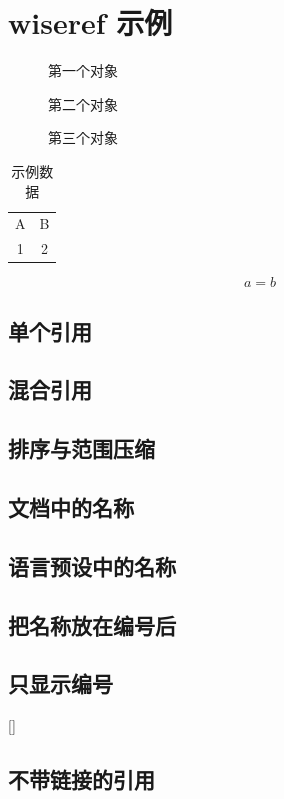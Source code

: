 \documentclass[fontset=fandol]{ctexart}
\newcommand\Result[2]{\par\noindent\hypertarget{example.#1}{}#2\par}
\begin{document}
\section*{wiseref 示例}
\begin{figure}[htbp]\centering{}\caption{第一个对象}\label{picture-a}\end{figure}
\begin{figure}[htbp]\centering{}\caption{第二个对象}\label{picture-b}\end{figure}
\begin{figure}[htbp]\centering{}\caption{第三个对象}\label{picture-c}\end{figure}
\begin{table}[htbp]\centering\caption{示例数据}\label{table-a}
  \begin{tabular}{cc}A&B\\1&2\end{tabular}
\end{table}
\begin{equation}a=b\label{equation}\end{equation}
\clearpage
\subsection*{单个引用}
\Result{single}{}
\subsection*{混合引用}
\Result{mixed}{}
\subsection*{排序与范围压缩}
{
 \Result{range}{}}
\subsection*{文档中的名称}
\Result{document-name}{}
\subsection*{语言预设中的名称}
{
 \Result{profile-name}{}}
\subsection*{把名称放在编号后}
{
 \Result{suffix-name}{}}
\subsection*{只显示编号}
\Result{number-only}{[]}
\subsection*{不带链接的引用}
\Result{star}{}
\end{document}
